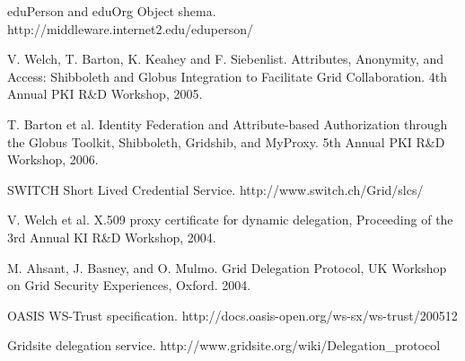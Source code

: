 \documentclass[twocolumn]{svjour3}         %
\begin{document}
\begin{thebibliography}{}
eduPerson and eduOrg Object shema. http://middleware.internet2.edu/eduperson/

V. Welch, T. Barton, K. Keahey and F. Siebenlist. Attributes, Anonymity, and Access: Shibboleth and Globus Integration to Facilitate Grid Collaboration. 4th Annual PKI R\&D Workshop, 2005.

T. Barton et al. Identity Federation and Attribute-based Authorization through the Globus Toolkit, Shibboleth, Gridshib, and MyProxy. 5th Annual PKI R\&D Workshop, 2006.

SWITCH Short Lived Credential Service. http://www.switch.ch/Grid/slcs/

V. Welch et al. X.509 proxy certificate for dynamic delegation, Proceeding of the 3rd Annual KI R\&D Workshop, 2004.

M. Ahsant, J. Basney, and O. Mulmo. Grid Delegation Protocol, UK Workshop on Grid Security Experiences, Oxford. 2004.

OASIS WS-Trust specification. http://docs.oasis-open.org/ws-sx/ws-trust/200512

Gridsite delegation service. http://www.gridsite.org/wiki/Delegation\_protocol

\end{thebibliography}
\end{document}
